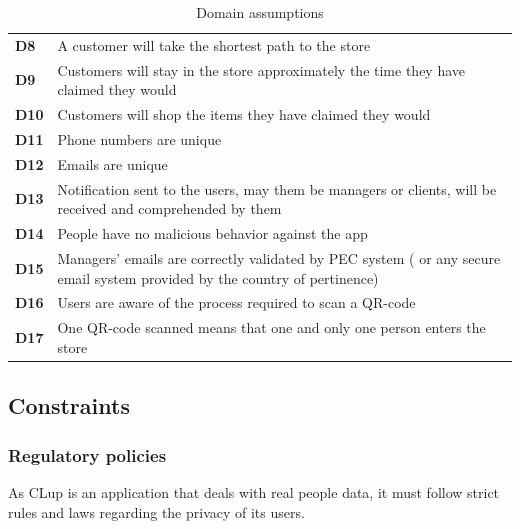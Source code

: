 \begin{table}[h!]
\begin{tabular}{@{}P{0.1\textwidth}P{0.80\textwidth}@{}}
        \textbf{D8}        & A customer will take the shortest path to the store\\ %
        \textbf{D9}        & Customers will stay in the store approximately the time they have claimed they would\\ %
        \textbf{D10}       & Customers will shop the items they have claimed they would\\
        \textbf{D11}       & Phone numbers are unique\\
        \textbf{D12}       & Emails are unique\\
        \textbf{D13}       & Notification sent to the users, may them be managers or clients, will be received and comprehended by them\\
        \textbf{D14}       & People have no malicious behavior against the app\\
        \textbf{D15}       & Managers' emails are correctly validated by PEC system ( or any secure email system provided by the country of pertinence)\\
        \textbf{D16}       & Users are aware of the process required to scan a QR-code\\
        \textbf{D17}       & One QR-code scanned means that one and only one person enters the store\\
        \bottomrule
    \end{tabular}
\caption{Domain assumptions}
\label{table:domainassumptions}
\end{table}

\FloatBarrier

\subsection{Constraints}
\label{subsect:contraints}

\subsubsection{Regulatory policies}
\label{subsubsect:regulatorypolicies}

As CLup is an application that deals with real people data, it must follow strict rules and laws regarding the privacy of its users.

